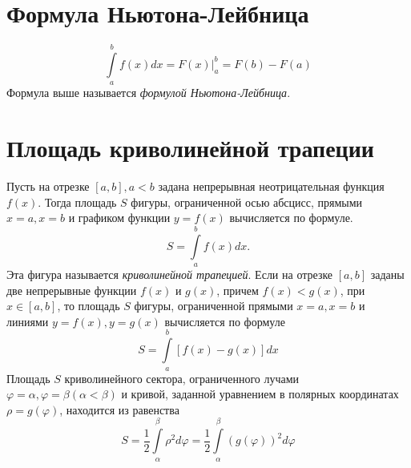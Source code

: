 \documentclass[11pt]{article}
\begin{document}
	\section{Формула Ньютона-Лейбница}
	$$
		\int\limits_a^b f(x)dx = \left. F(x)\right|_a^b = F(b) - F(a)
	$$
	Формула выше называется \textit{формулой Ньютона-Лейбница}.
	\section{Площадь криволинейной трапеции}
	Пусть на отрезке $[a, b], a < b$ задана непрерывная неотрицательная функция $f(x)$.
	Тогда площадь $S$ фигуры, ограниченной осью абсцисс, прямыми $x = a, x = b$ и графиком функции $y = f(x)$ вычисляется по формуле.
	$$
		S = \int\limits_a^b f(x) dx.
	$$
	Эта фигура называется \textit{криволинейной трапецией}.
	Если на отрезке $[a, b]$ заданы две непрерывные функции $f(x)$ и $g(x)$, причем $f(x) < g(x)$, при $x \in [a, b]$, то площадь $S$ фигуры, ограниченной прямыми $x = a, x = b$ и линиями $y = f(x), y = g(x)$ вычисляется по формуле
	$$
		S = \int\limits^b_a [f(x) - g(x)] dx
	$$
	Площадь $S$ криволинейного сектора, ограниченного лучами $\varphi = \alpha, \varphi = \beta (\alpha < \beta)$ и кривой, заданной уравнением в полярных координатах $\rho = g(\varphi )$, находится из равенства
	$$
		S = \frac{1}{2}\int\limits^\beta_\alpha \rho ^2 d\varphi = \frac{1}{2}\int\limits^\beta_\alpha (g(\varphi ))^2 d\varphi
	$$
\end{document}
